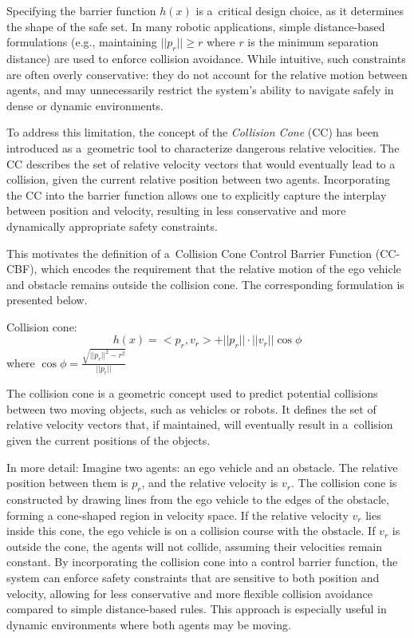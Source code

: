 \documentclass{svproc}
\begin{document}
Specifying the barrier function $h(x)$ is a~critical design choice, as it 
determines the shape of the safe set. In many robotic applications, simple 
distance-based formulations (e.g., maintaining $||p_{r}|| \geq r$ where $r$ 
is the minimum separation distance) are used to enforce collision avoidance. 
While intuitive, such constraints are often overly conservative: they do not 
account for the relative motion between agents, and may unnecessarily restrict 
the system's ability to navigate safely in dense or dynamic environments.

To address this limitation, the concept of the \emph{Collision Cone} (CC) has 
been introduced as a~geometric tool to characterize dangerous relative velocities. 
The CC describes the set of relative velocity vectors that would eventually 
lead to a collision, given the current relative position between two agents. 
Incorporating the CC into the barrier function allows one to explicitly capture 
the interplay between position and velocity, resulting in less conservative 
and more dynamically appropriate safety constraints. 

This motivates the definition of a~Collision Cone Control Barrier Function 
(CC-CBF), which encodes the requirement that the relative motion of the ego 
vehicle and obstacle remains outside the collision cone. The corresponding 
formulation is presented below.

Collision cone:
\begin{equation}
    \label{eq:collision_cone_cbf}
    h(x) = <p_{r},v_{r}> + ||p_{r}||\cdot||v_{r}||\cos{\phi}
\end{equation}
where $\cos{\phi} = \frac{\sqrt{||p_{r}||^2 - r^{2}}}{||p_{r}||}$

\cite{tayal2024collisionconeapproachcontrol}

The collision cone is a geometric concept used to predict potential collisions
between two moving objects, such as vehicles or robots. It defines the set of
relative velocity vectors that, if maintained, will eventually result in
a~collision given the current positions of the objects.

In more detail:
Imagine two agents: an ego vehicle and an obstacle. The relative position between them is $p_r$, and the relative velocity is $v_r$.
The collision cone is constructed by drawing lines from the ego vehicle to the edges of the obstacle, forming a cone-shaped region in velocity space.
If the relative velocity $v_r$ lies inside this cone, the ego vehicle is on a collision course with the obstacle.
If $v_r$ is outside the cone, the agents will not collide, assuming their velocities remain constant.
By incorporating the collision cone into a control barrier function, the system can enforce safety constraints that are sensitive to both position and velocity, allowing for less conservative and more flexible collision avoidance compared to simple distance-based rules. This approach is especially useful in dynamic environments where both agents may be moving.
\end{document}
